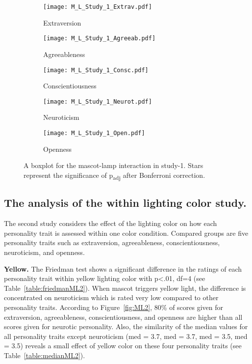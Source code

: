 \begin{figure}[hbt!]
    \centering
    \begin{subfigure}{.40\textwidth}
        \centering
        \texttt{[image: M\_L\_Study\_1\_Extrav.pdf]}
        \caption{Extraversion}
        \label{fig:sub1}
    \end{subfigure}\hfill%
    \begin{subfigure}{.40\textwidth}
        \centering
        \texttt{[image: M\_L\_Study\_1\_Agreeab.pdf]}
        \caption{Agreeableness}
        \label{fig:sub2}
    \end{subfigure}\hfill
    \begin{subfigure}{.40\textwidth}
        \centering
        \texttt{[image: M\_L\_Study\_1\_Consc.pdf]}
        \caption{Conscientiousness}
        \label{fig:sub1}
    \end{subfigure}\hfill%
    \begin{subfigure}{.40\textwidth}
        \centering
        \texttt{[image: M\_L\_Study\_1\_Neurot.pdf]}
        \caption{Neuroticism}
        \label{fig:sub1}
    \end{subfigure}\hfill%
    \begin{subfigure}{.40\textwidth}
        \centering
        \texttt{[image: M\_L\_Study\_1\_Open.pdf]}
        \caption{Openness}
        \label{fig:sub1}
    \end{subfigure}\hfill%
    \caption{A boxplot for the mascot-lamp interaction in study-1.
    Stars represent the significance of p\textsubscript{adj} after Bonferroni correction.}
    \label{fig:ML1}
\end{figure}
\subsection{The analysis of the within lighting color study.}
\label{subsec:MLstudy2}
The second study considers the effect of the lighting color on how each
personality trait is assessed within one color condition.
Compared groups are five personality traits such as extraversion, agreeableness, conscientiousness,
neuroticism, and openness.

\par\textbf{Yellow.}
The Friedman test shows a significant difference in the ratings of each personality trait
within yellow lighting color with p<.01, df=4 (see Table~\ref{table:friedmanML2}).
When mascot triggers yellow light, the difference is concentrated on neuroticism
which is rated very low compared to other personality traits.
According to Figure~\ref{fig:ML2}, 80\% of scores given for extraversion, agreeableness,
conscientiousness, and openness are higher than all scores given for neurotic personality.
Also, the similarity of the median values for all personality traits except
neuroticism (med = 3.7, med = 3.7, med = 3.5, med = 3.5) reveals a small effect of yellow
color on these four personality traits (see Table~\ref{table:medianML2}).

